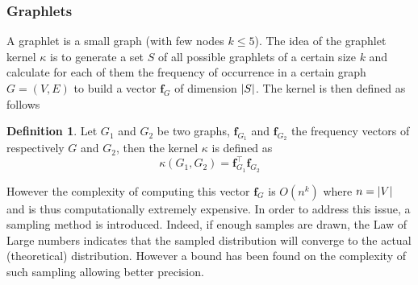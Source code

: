 \documentclass{article}
\DeclarePairedDelimiter{\abs}{\lvert}{\rvert}
\let\vec\mathbf
\theoremstyle{definition}
\newtheorem{definition}{Definition}
\begin{document}
\subsubsection{Graphlets}
A graphlet is a small graph (with few nodes $k \leq 5$). The idea of the graphlet kernel $\kappa$ is to generate a set $S$ of all possible graphlets of a certain size $k$ and calculate for each of them the frequency of occurrence in a certain graph $G=(V,E)$ to build a vector $\vec{f}_G$ of dimension $\abs{S}$. The kernel is then defined as follows
\begin{definition}
	Let $G_1$ and $G_2$ be two graphs, ${\vec{f}_{G_{1}}}$ and $\vec{f}_{G_2}$ the frequency vectors of respectively $G$ and $G_2$, then the kernel $\kappa$ is defined as
	\begin{equation}
		\kappa(G_1,G_{2})=\vec{f}_{G_1}^{\top}\vec{f}_{G_2}
	\end{equation}
\end{definition}
However the complexity of computing this vector $\vec{f}_G$ is $O(n^k)$\cite{shervashidze_efficient_2009} where $n=\abs{V}$ and is thus computationally extremely expensive. In order to address this issue, a sampling method is introduced. Indeed, if enough samples are drawn, the Law of Large numbers indicates that the sampled distribution will converge to the actual (theoretical) distribution. However a bound has been found on the complexity of such sampling\cite{weissman2003inequalities} allowing better precision.
\end{document}
